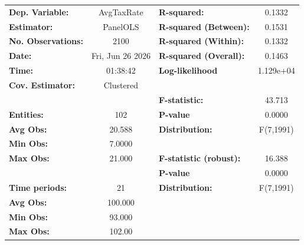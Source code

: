 \begin{center}
\begin{tabular}{lclc}
\toprule
\textbf{Dep. Variable:}                       &     AvgTaxRate     & \textbf{  R-squared:         }   &      0.1332      \\
\textbf{Estimator:}                           &      PanelOLS      & \textbf{  R-squared (Between):}  &      0.1531      \\
\textbf{No. Observations:}                    &        2100        & \textbf{  R-squared (Within):}   &      0.1332      \\
\textbf{Date:}                                &  Fri, Jun 26 2026  & \textbf{  R-squared (Overall):}  &      0.1463      \\
\textbf{Time:}                                &      01:38:42      & \textbf{  Log-likelihood     }   &    1.129e+04     \\
\textbf{Cov. Estimator:}                      &     Clustered      & \textbf{                     }   &                  \\
\textbf{}                                     &                    & \textbf{  F-statistic:       }   &      43.713      \\
\textbf{Entities:}                            &        102         & \textbf{  P-value            }   &      0.0000      \\
\textbf{Avg Obs:}                             &       20.588       & \textbf{  Distribution:      }   &    F(7,1991)     \\
\textbf{Min Obs:}                             &       7.0000       & \textbf{                     }   &                  \\
\textbf{Max Obs:}                             &       21.000       & \textbf{  F-statistic (robust):} &      16.388      \\
\textbf{}                                     &                    & \textbf{  P-value            }   &      0.0000      \\
\textbf{Time periods:}                        &         21         & \textbf{  Distribution:      }   &    F(7,1991)     \\
\textbf{Avg Obs:}                             &      100.000       & \textbf{                     }   &                  \\
\textbf{Min Obs:}                             &       93.000       & \textbf{                     }   &                  \\
\textbf{Max Obs:}                             &       102.00       & \textbf{                     }   &                  \\

\end{tabular}
\end{center}
